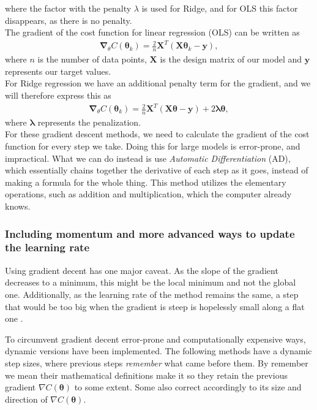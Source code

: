 \documentclass[reprint,english,notitlepage]{revtex4-2}  %
\begin{document}
    where the factor with the penalty $\lambda$ is used for Ridge, and for OLS this factor disappears, as there is no penalty. \\
    The gradient of the cost function for linear regression (OLS) can be written as
    \begin{align}\label{eq: gradient of OLS}
        \bm{\nabla}_{\theta} C(\bm{\theta}_k) = \frac{2}{n} \bm{X}^T (\bm{X}\bm{\theta}_k - \bm{y}),
    \end{align}
    where $n$ is the number of data points, $\bm{X}$ is the design matrix of our model and $\bm{y}$ represents our target values. \\
    For Ridge regression we have an additional penalty term for the gradient, and we  will therefore express this as
    \begin{align}\label{eq: gradient for ridge}
        \bm{\nabla}_{\theta} C(\bm{\theta}_k) = \frac{2}{n} \bm{X}^T (\bm{X}\bm{\theta} - \bm{y}) + 2 \bm{\lambda}\bm{\theta},
    \end{align}
    where $\bm{\lambda}$ represents the penalization. \\
    For these gradient descent methods, we need to calculate the gradient of the cost function for every step we take. Doing this for large models is error-prone, and impractical. What we can do instead is use \textit{Automatic Differentiation} (AD), which essentially chains together the derivative of each step as it goes, instead of making a formula for the whole thing. This method utilizes the elementary operations, such as addition and multiplication, which the computer already knows. 

    

\subsubsection{Including momentum and more advanced ways to update the learning rate} %
%

Using gradient decent has one major caveat. As the slope of the gradient decreases to a minimum, this might be the local minimum and not the global one. Additionally, as the learning rate of the method remains the same, a step that would be too big when the gradient is steep is hopelessly small along a flat one \cite{addition_w38}. 

To circumvent gradient decent error-prone and computationally expensive ways, dynamic versions have been implemented. The following methods have a dynamic step sizes, where previous steps \textit{remember} what came before them. By remember we mean their mathematical definitions make it so they retain the previous gradient $\nabla C(\bm{\theta})$ to some extent. Some also correct accordingly to its size and direction of  $\nabla C(\bm{\theta})$.
\end{document}
